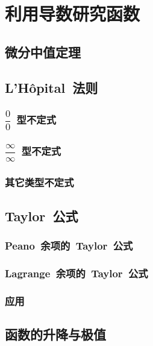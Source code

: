 

\chapter{利用导数研究函数}\label{ch:5}
\section{微分中值定理}
\begin{exercise}

\end{exercise}
\section{L'H\^opital~法则}
\subsection{$\dfrac 00$~型不定式}
\subsection{$\dfrac\infty\infty$~型不定式}
\subsection{其它类型不定式}
\begin{exercise}

\end{exercise}
\section{Taylor~公式}
\subsection{Peano~余项的~Taylor~公式}
\subsection{Lagrange~余项的~Taylor~公式}
\subsection{应用}
\begin{exercise}

\end{exercise}
\section{函数的升降与极值}
